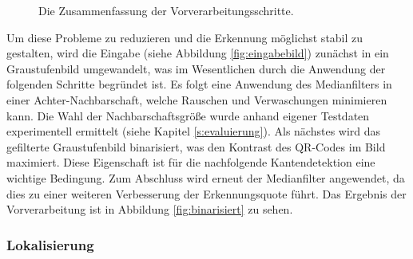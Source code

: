 \documentclass[a4paper, oneside, 12pt]{article}
\begin{document}
\begin{figure}[h]
	\begin{center}
	\end{center}
	\caption{Die Zusammenfassung der Vorverarbeitungsschritte.}
	\label{fig:vorverarbeitung}
\end{figure}

Um diese Probleme zu reduzieren und die Erkennung möglichst stabil zu gestalten, wird die Eingabe (siehe Abbildung \ref{fig:eingabebild}) zunächst in ein Graustufenbild umgewandelt, was im Wesentlichen durch die Anwendung der folgenden Schritte begründet ist.
Es folgt eine Anwendung des Medianfilters in einer Achter-Nachbarschaft, welche Rauschen und Verwaschungen minimieren kann. Die Wahl der Nachbarschaftsgröße wurde anhand eigener Testdaten experimentell ermittelt (siehe Kapitel \ref{s:evaluierung}).
Als nächstes wird das gefilterte Graustufenbild binarisiert, was den Kontrast des QR-Codes im Bild maximiert. Diese Eigenschaft ist für die nachfolgende Kantendetektion eine wichtige Bedingung.
Zum Abschluss wird erneut der Medianfilter angewendet, da dies zu einer weiteren Verbesserung der Erkennungsquote führt.
Das Ergebnis der Vorverarbeitung ist in Abbildung \ref{fig:binarisiert} zu sehen.

\subsubsection{Lokalisierung}
\end{document}
